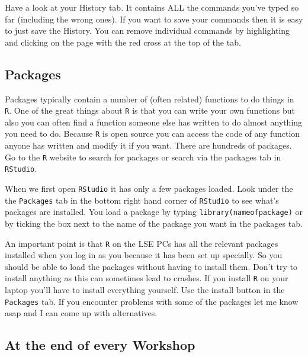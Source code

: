 \documentclass[
]{gitbook}
\begin{document}
Have a look at your History tab. It contains ALL the commands you've typed so far (including the wrong ones). If you want to save your commands then it is easy to just save the History. You can remove individual commands by highlighting and clicking on the page with the red cross at the top of the tab.

\hypertarget{packages}{%
\subsection{Packages}\label{packages}}

Packages typically contain a number of (often related) functions to do things in \texttt{R}. One of the great things about \texttt{R} is that you can write your own functions but also you can often find a function someone else has written to do almost anything you need to do. Because \texttt{R} is open source you can access the code of any function anyone has written and modify it if you want. There are hundreds of packages. Go to the \texttt{R} website to search for packages or search via the packages tab in \texttt{RStudio}.

When we first open \texttt{RStudio} it has only a few packages loaded. Look under the the \texttt{Packages} tab in the bottom right hand corner of \texttt{RStudio} to see what's packages are installed. You load a package by typing \texttt{library(nameofpackage)} or by ticking the box next to the name of the package you want in the packages tab.

An important point is that \texttt{R} on the LSE PCs has all the relevant packages installed when you log in as you because it has been set up specially. So you should be able to load the packages without having to install them. Don't try to install anything as this can sometimes lead to crashes. If you install \texttt{R} on your laptop you'll have to install everything yourself. Use the install button in the \texttt{Packages} tab. If you encounter problems with some of the packages let me know asap and I can come up with alternatives.

\hypertarget{at-the-end-of-every-workshop}{%
\subsection{At the end of every Workshop}\label{at-the-end-of-every-workshop}}
\end{document}

